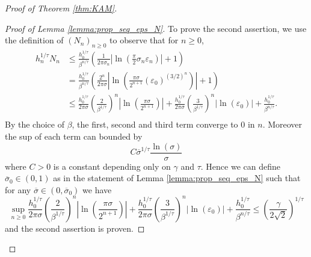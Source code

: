 \documentclass[10pt]{article}
\begin{document}
\begin{proof}[Proof of Theorem \ref{thm:KAM}]
\begin{proof}[Proof of Lemma \ref{lemma:prop_seq_eps_N}]
To prove the second assertion, we use the definition of $(N_n)_{n\geq 0}$ to observe that for $n\geq 0$,
\begin{align*}
    h_n^{1/\tau}N_n
    & \leq 
    \frac{h_0^{1/\tau}}{\beta^{n/\tau}}
    \left(
    \frac{1}{2\pi\sigma_n}
    \left|
    \ln\left(
    \frac{\pi}{2}\sigma_n \varepsilon_n
    \right)
    \right|
    +1
    \right)\\
    & =
    \frac{h_0^{1/\tau}}{\beta^{n/\tau}}
    \left(
    \frac{2^n}{2\pi\sigma}
    \left|
    \ln\left(
    \frac{\pi\sigma}{2^{n+1}}(\varepsilon_0)^{(3/2)^n}
    \right)
    \right|
    +1
    \right)\\
    & \leq
    \frac{h_0^{1/\tau}}{2\pi\sigma}
    \left(
    \frac{2}{\beta^{1/\tau}}
    \right)^n
    \left|
    \ln\left(
    \frac{\pi\sigma}{2^{n+1}}
    \right)
    \right|
    +
    \frac{h_0^{1/\tau}}{2\pi\sigma}
    \left(
    \frac{3}{\beta^{1/\tau}}
    \right)^n
    \left|
    \ln\left(
    \varepsilon_0
    \right)
    \right|
    +
    \frac{h_0^{1/\tau}}{\beta^{n/\tau}}.
    \\
\end{align*}
By the choice of $\beta$, the first, second and third term converge to $0$ in $n$. 
Moreover the sup of each term can bounded by 
\[
C\overline\sigma^{1/\tau}\frac{\ln(\sigma)}{\sigma}
\]
where $C>0$ is a constant depending only on $\gamma$ and $\tau$.
Hence we can define $\overline\sigma_0\in(0,1)$ as in the statement of Lemma \ref{lemma:prop_seq_eps_N} such that for any $\overline\sigma\in(0,\overline\sigma_0)$ we have
\[
\sup_{n\geq 0} 
    \frac{h_0^{1/\tau}}{2\pi\sigma}
    \left(
    \frac{2}{\beta^{1/\tau}}
    \right)^n
    \left|
    \ln\left(
    \frac{\pi\sigma}{2^{n+1}}
    \right)
    \right|
    +
    \frac{h_0^{1/\tau}}{2\pi\sigma}
    \left(
    \frac{3}{\beta^{1/\tau}}
    \right)^n
    \left|
    \ln\left(
    \varepsilon_0
    \right)
    \right|
    +
    \frac{h_0^{1/\tau}}{\beta^{n/\tau}}
    \leq
    \left(\frac{\gamma}{2\sqrt 2}\right)^{1/\tau}
\]
and the second assertion is proven.


\end{proof}
\end{proof}
\end{document}
